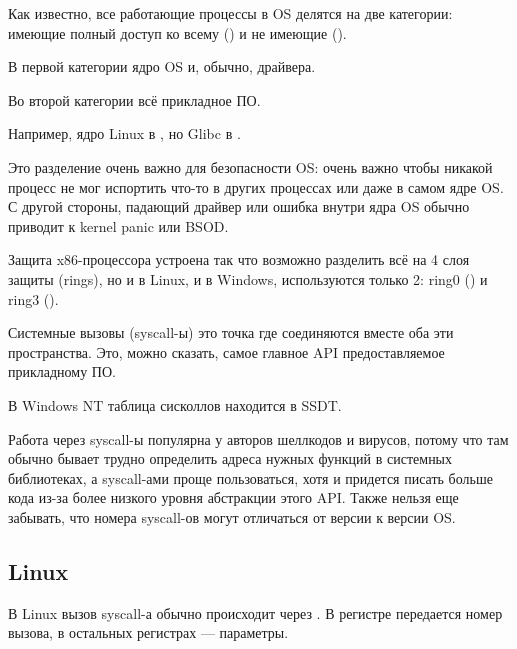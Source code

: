 
\label{syscalls}

Как известно, все работающие процессы в \ac{OS} делятся на две категории:
имеющие полный доступ ко всему  () 
и не имеющие ().

В первой категории ядро \ac{OS} и, обычно, драйвера.

Во второй категории всё прикладное ПО.


Например, ядро Linux в , но Glibc в .

Это разделение очень важно для безопасности \ac{OS}:
очень важно чтобы никакой процесс не мог испортить что-то в других процессах
или даже в самом ядре \ac{OS}.
С другой стороны, падающий драйвер или ошибка внутри ядра \ac{OS} обычно приводит к kernel panic или \ac{BSOD}.

Защита x86-процессора устроена так что возможно разделить всё на 4 слоя защиты (rings), но и в Linux,
и в Windows, используются только 2: ring0 () и ring3 ().

Системные вызовы (syscall-ы)
это точка где соединяются вместе оба эти пространства.
Это, можно сказать, самое главное \ac{API} предоставляемое прикладному ПО.

В \gls{Windows NT} таблица сисколлов находится в \ac{SSDT}.

Работа через syscall-ы популярна у авторов шеллкодов и вирусов,
потому что там обычно бывает трудно определить адреса нужных функций в системных библиотеках,
а syscall-ами проще пользоваться, хотя и придется писать больше
кода из-за более низкого уровня абстракции этого \ac{API}.
Также нельзя еще забывать, что номера syscall-ов могут отличаться от версии к версии OS.

\subsection{Linux}
\label{linux_syscall}

В Linux вызов syscall-а обычно происходит через .
В регистре \EAX передается номер вызова,
в остальных регистрах --- параметры.



